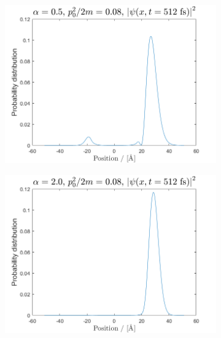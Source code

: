 \begin{figure}[H]

\centering
\begin{subfigure}[t]{0.47\textwidth}
	\includegraphics[width=\textwidth]{graphics/Task3/a1e1.png}
	\caption{}
	\label{fig:3_a}
\end{subfigure}
\begin{subfigure}[t]{0.47\textwidth}
	\includegraphics[width=\textwidth]{graphics/Task3/a2e1.png}
	\caption{}
	\label{fig:3_b}
\end{subfigure}


\end{figure}
